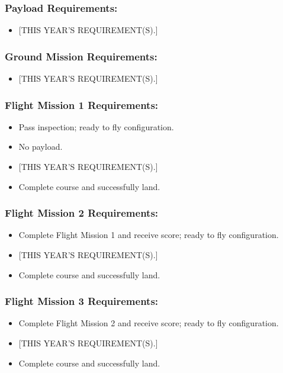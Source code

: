 \documentclass[report]{byu-aero}
\begin{document}
\subsubsection{Payload Requirements:}
\begin{itemize}
	\item {\color{\BYUred} [THIS YEAR'S REQUIREMENT(S).]}
\end{itemize}


\subsubsection{Ground Mission Requirements:}
\begin{itemize}
	\item {\color{\BYUred} [THIS YEAR'S REQUIREMENT(S).]}
\end{itemize}


\subsubsection{Flight Mission 1 Requirements:}
\begin{itemize}
	\item Pass inspection; ready to fly configuration.
	\item No payload.
	\item {\color{\BYUred} [THIS YEAR'S REQUIREMENT(S).]}
	\item Complete course and successfully land.
\end{itemize}


\subsubsection{Flight Mission 2 Requirements:}
\begin{itemize}
	\item Complete Flight Mission 1 and receive score; ready to fly configuration.
	\item {\color{\BYUred} [THIS YEAR'S REQUIREMENT(S).]}
		\item Complete course and successfully land.
\end{itemize}


\subsubsection{Flight Mission 3 Requirements:}
\begin{itemize}
	\item Complete Flight Mission 2 and receive score; ready to fly configuration.
	\item {\color{\BYUred} [THIS YEAR'S REQUIREMENT(S).]}
	\item Complete course and successfully land. 
\end{itemize}
\end{document}
